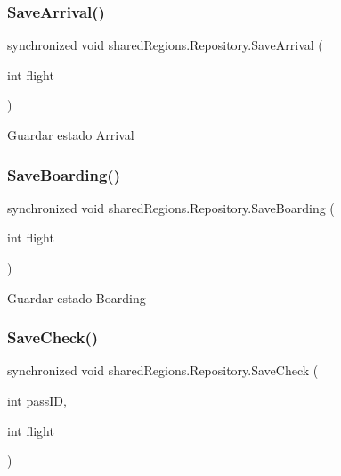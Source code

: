\subsubsection{\texorpdfstring{Save\+Arrival()}{SaveArrival()}}
{\footnotesize\ttfamily synchronized void shared\+Regions.\+Repository.\+Save\+Arrival (\begin{DoxyParamCaption}\item[{int}]{flight }\end{DoxyParamCaption})\hspace{0.3cm}{\ttfamily [inline]}}

Guardar estado Arrival \mbox{\label{classshared_regions_1_1_repository_a325b96a2510f6ebe8aad62f417a11e67}} 
\subsubsection{\texorpdfstring{Save\+Boarding()}{SaveBoarding()}}
{\footnotesize\ttfamily synchronized void shared\+Regions.\+Repository.\+Save\+Boarding (\begin{DoxyParamCaption}\item[{int}]{flight }\end{DoxyParamCaption})\hspace{0.3cm}{\ttfamily [inline]}}

Guardar estado Boarding \mbox{\label{classshared_regions_1_1_repository_a0605714eca9f1b1d33bcf6aa829cca4e}} 
\subsubsection{\texorpdfstring{Save\+Check()}{SaveCheck()}}
{\footnotesize\ttfamily synchronized void shared\+Regions.\+Repository.\+Save\+Check (\begin{DoxyParamCaption}\item[{int}]{pass\+ID,  }\item[{int}]{flight }\end{DoxyParamCaption})\hspace{0.3cm}{\ttfamily [inline]}}

